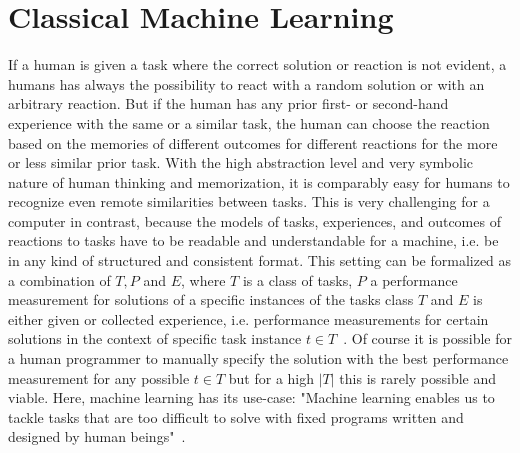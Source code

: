 \section{Classical Machine Learning}
\label{sec:theory:ml}
If a human is given a task where the correct solution or reaction is not evident, a humans has always the possibility to react with a random solution or with an arbitrary reaction.
But if the human has any prior first- or second-hand experience with the same or a similar task, the human can choose the reaction based on the memories of different outcomes for different reactions for the more or less similar prior task.
With the high abstraction level and very symbolic nature of human thinking and memorization, it is comparably easy for humans to recognize even remote similarities between tasks.\newline
This is very challenging for a computer in contrast, because the models of tasks, experiences, and outcomes of reactions to tasks have to be readable and understandable for a machine, i.e. be in any kind of structured and consistent format.
This setting can be formalized as a combination of $T, P$ and $E$, where $T$ is a class of tasks, $P$ a performance measurement for solutions of a specific instances of the tasks class $T$ and $E$ is either given or collected experience, i.e. performance measurements for certain solutions in the context of specific task instance $t\in T$~\cite{Mitchell-MachineLearning}.\newline
Of course it is possible for a human programmer to manually specify the solution with the best performance measurement for any possible $t\in T$ but for a high $|T|$ this is rarely possible and viable.
Here, machine learning has its use-case: "Machine learning enables us to tackle tasks that are too difficult to solve with fixed programs written and designed by human beings"~\cite{Goodfellow-DeepLearning}.


